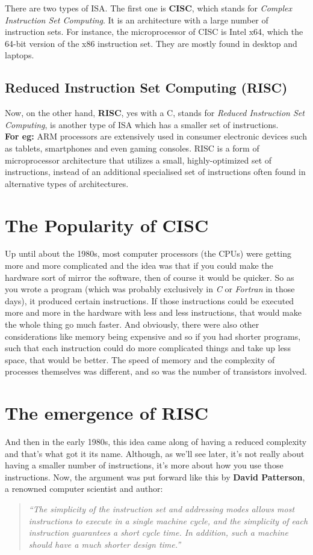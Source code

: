 \documentclass[conference]{IEEEtran}
\begin{document}
There are two types of ISA. The first one is \textbf{CISC}, which stands for \emph{Complex Instruction Set Computing}. It is an architecture with a large number of instruction sets. For instance, the microprocessor of CISC is Intel x64, which the 64-bit version of the x86 instruction set. They are mostly found in desktop and laptops. 

\subsection{Reduced Instruction Set Computing (RISC)}

Now, on the other hand, \textbf{RISC}, yes with a C, stands for \emph{Reduced Instruction Set Computing}, is another type of ISA which has a smaller set of instructions.\\
\textbf{For eg:} ARM processors are extensively used in consumer electronic devices such as tablets, smartphones and even gaming consoles. RISC is a form of microprocessor architecture that utilizes a small, highly-optimized set of instructions, instead of an additional specialised set of instructions often found in alternative types of architectures. 


\section{The Popularity of CISC}
Up until about the 1980s, most computer processors (the CPUs) were getting more and more complicated and the idea was that if you could make the hardware sort of mirror the software, then of course it would be quicker. So as you wrote a program (which was probably exclusively in \textit{C} or \textit{Fortran} in those days), it produced certain instructions. If those instructions could be executed more and more in the hardware with less and less instructions, that would make the whole thing go much faster. And obviously, there were also other considerations like memory being expensive and so if you had shorter programs, such that each instruction could do more complicated things and take up less space, that would be better. The speed of memory and the complexity of processes themselves was different, and so was the number of transistors involved.


\section{The emergence of RISC}
And then in the early 1980s, this idea came along of having a reduced complexity and that’s what got it its name. Although, as we’ll see later, it’s not really about having a smaller number of instructions, it’s more about how you use those instructions. Now, the argument was put forward like this by \textbf{David Patterson}, a renowned computer scientist and author:
\begin{quote}
\textit{“The simplicity of the instruction set and addressing modes allows most instructions to execute in a single machine cycle, and the simplicity of each instruction guarantees a short cycle time. In addition, such a machine should have a much shorter design time.”\cite{b1}}
\end{quote}
\end{document}
